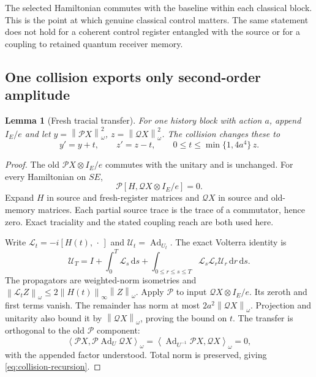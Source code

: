 \documentclass[11pt]{article}
\numberwithin{equation}{section}
\newtheorem{lemma}[theorem]{Lemma}
\theoremstyle{remark}
\newcommand{\Ad}{\operatorname{Ad}}
\newcommand{\Pcal}{\mathcal P}
\newcommand{\Qcal}{\mathcal Q}
\newcommand{\Ucal}{\mathcal U}
\newcommand{\norm}[1]{\left\lVert#1\right\rVert}
\newcommand{\ip}[2]{\left\langle#1,#2\right\rangle}
\newcommand{\dd}{\,\mathrm d}
\begin{document}
The selected Hamiltonian commutes with the baseline within each classical
block. This is the point at which genuine classical control matters. The
same statement does not hold for a coherent control register entangled with
the source or for a coupling to retained quantum receiver memory.

\subsection{One collision exports only second-order amplitude}
\begin{lemma}[Fresh tracial transfer]
\label{lem:onecollision}
For one history block with action \(a\), append \(I_E/e\) and let
\(y=\norm{\Pcal X}_\omega^2\), \(z=\norm{\Qcal X}_\omega^2\).
The collision changes these to
\begin{equation}
 y'=y+t,\qquad z'=z-t,\qquad
 0\le t\le\min\{1,4a^4\}\,z .
 \label{eq:collision-recursion}
\end{equation}
\end{lemma}
\begin{proof}
The old \(\Pcal X\otimes I_E/e\) commutes with the unitary and is unchanged.
For every Hamiltonian on \(SE\),
\begin{equation}
 \Pcal[H,\Qcal X\otimes I_E/e]=0.
 \label{eq:first-order-zero}
\end{equation}
Expand \(H\) in source and fresh-register matrices and \(\Qcal X\) in source
and old-memory matrices. Each partial source trace is the trace of a
commutator, hence zero. Exact traciality and the stated coupling reach are
both used here.

Write \(\mathcal L_t=-i[H(t),\,\cdot\,]\) and
\(\Ucal_t=\Ad_{U_t}\). The exact Volterra identity is
\[
 \Ucal_T=I+\int_0^T\mathcal L_s\dd s+
     \int_{0\le r\le s\le T}\mathcal L_s\mathcal L_r\Ucal_r
                  \dd r\dd s .
\]
The propagators are weighted-norm isometries and
\(\norm{\mathcal L_t Z}_\omega\le
2\norm{H(t)}_\infty\norm Z_\omega\).
Apply \(\Pcal\) to input \(\Qcal X\otimes I_E/e\).
Its zeroth and first terms vanish. The remainder has norm at most
\(2a^2\norm{\Qcal X}_\omega\). Projection and unitarity also bound it by
\(\norm{\Qcal X}_\omega\), proving the bound on \(t\).
The transfer is orthogonal to the old \(\Pcal\) component:
\[
 \ip{\Pcal X}{\Pcal\Ad_U\Qcal X}_\omega
 =\ip{\Ad_{U^{-1}}\Pcal X}{\Qcal X}_\omega=0,
\]
with the appended factor understood. Total norm is preserved, giving
\eqref{eq:collision-recursion}.
\end{proof}
\end{document}
